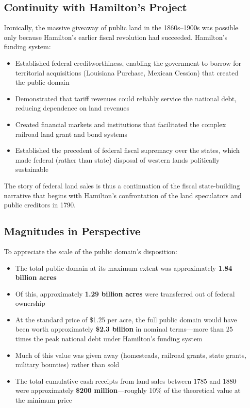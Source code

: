 \documentclass[12pt]{article}
\begin{document}
\subsection{Continuity with Hamilton's Project}

Ironically, the massive giveaway of public land in the 1860s--1900s was possible only because Hamilton's earlier fiscal revolution had succeeded.  Hamilton's funding system:

\begin{itemize}
\item Established federal creditworthiness, enabling the government to borrow for territorial acquisitions (Louisiana Purchase, Mexican Cession) that created the public domain
\item Demonstrated that tariff revenues could reliably service the national debt, reducing dependence on land revenues
\item Created financial markets and institutions that facilitated the complex railroad land grant and bond systems
\item Established the precedent of federal fiscal supremacy over the states, which made federal (rather than state) disposal of western lands politically sustainable
\end{itemize}

The story of federal land sales is thus a continuation of the fiscal state-building narrative that begins with Hamilton's confrontation of the land speculators and public creditors in 1790.

\subsection{Magnitudes in Perspective}

To appreciate the scale of the public domain's disposition:

\begin{itemize}
\item The total public domain at its maximum extent was approximately \textbf{1.84 billion acres}
\item Of this, approximately \textbf{1.29 billion acres} were transferred out of federal ownership
\item At the standard price of \$1.25 per acre, the full public domain would have been worth approximately \textbf{\$2.3 billion} in nominal terms---more than 25 times the peak national debt under Hamilton's funding system
\item Much of this value was given away (homesteads, railroad grants, state grants, military bounties) rather than sold
\item The total cumulative cash receipts from land sales between 1785 and 1880 were approximately \textbf{\$200 million}---roughly 10\% of the theoretical value at the minimum price
\end{itemize}
\end{document}
